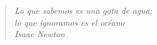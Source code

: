 \indent

\vfill

\begin{quote}
\begin{flushright}
	\textit{Lo que sabemos es una gota de agua;}\\
	\textit{lo que ignoramos es el océano}\\
	\textit{Isaac Newton}
\end{flushright}



\end{quote}

\vfill
\cleardoublepage

\pagestyle{plain}
